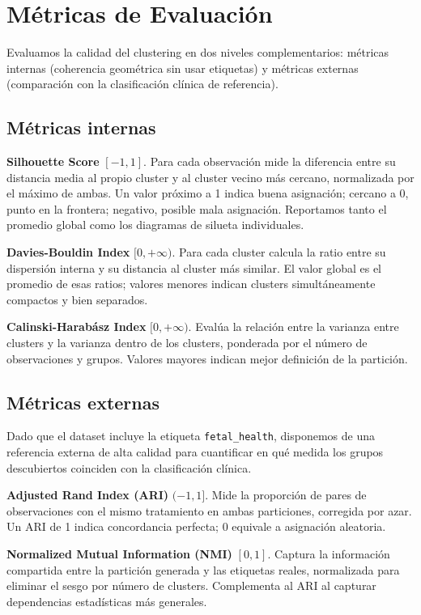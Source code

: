 \documentclass[12pt,letterpaper]{article}
\begin{document}
\section{Métricas de Evaluación}

Evaluamos la calidad del clustering en dos niveles complementarios: métricas internas
(coherencia geométrica sin usar etiquetas) y métricas externas (comparación con la
clasificación clínica de referencia).

\subsection{Métricas internas}

\textbf{Silhouette Score} $[-1, 1]$. Para cada observación mide la diferencia entre su
distancia media al propio cluster y al cluster vecino más cercano, normalizada por el
máximo de ambas. Un valor próximo a 1 indica buena asignación; cercano a 0, punto en la
frontera; negativo, posible mala asignación. Reportamos tanto el promedio global como los
diagramas de silueta individuales.

\textbf{Davies-Bouldin Index} $[0, +\infty)$. Para cada cluster calcula la ratio entre su
dispersión interna y su distancia al cluster más similar. El valor global es el promedio de
esas ratios; valores menores indican clusters simultáneamente compactos y bien separados.

\textbf{Calinski-Harabász Index} $[0, +\infty)$. Evalúa la relación entre la varianza
entre clusters y la varianza dentro de los clusters, ponderada por el número de observaciones
y grupos. Valores mayores indican mejor definición de la partición.

\subsection{Métricas externas}

Dado que el dataset incluye la etiqueta \texttt{fetal\_health}, disponemos de una referencia
externa de alta calidad para cuantificar en qué medida los grupos descubiertos coinciden
con la clasificación clínica.

\textbf{Adjusted Rand Index (ARI)} $(-1, 1]$. Mide la proporción de pares de observaciones
con el mismo tratamiento en ambas particiones, corregida por azar. Un ARI de 1 indica
concordancia perfecta; 0 equivale a asignación aleatoria.

\textbf{Normalized Mutual Information (NMI)} $[0, 1]$. Captura la información compartida
entre la partición generada y las etiquetas reales, normalizada para eliminar el sesgo por
número de clusters. Complementa al ARI al capturar dependencias estadísticas más generales.
\end{document}
